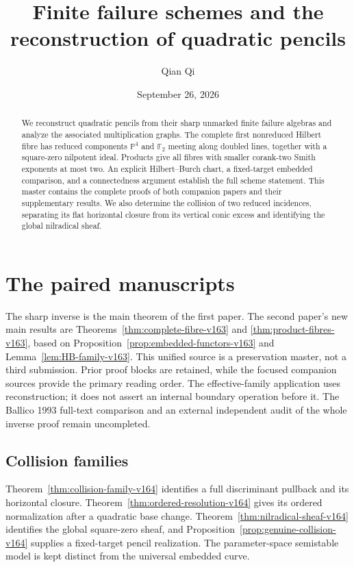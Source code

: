\documentclass[11pt,reqno]{amsart}
\numberwithin{equation}{section}
\theoremstyle{definition}\newtheorem{definition}[theorem]{Definition}
\theoremstyle{remark}\newtheorem{remark}[theorem]{Remark}
\newcommand{\Pj}{\mathbb P}\newcommand{\A}{\mathbb A}
\begin{document}
\title[Finite failure schemes and quadratic pencils]{Finite failure schemes and the reconstruction of quadratic pencils}
\author{Qian Qi}
\date{September 26, 2026}
\begin{abstract}
We reconstruct quadratic pencils from their sharp unmarked finite
failure algebras and analyze the associated multiplication graphs.
The complete first nonreduced Hilbert fibre has reduced components
$\Pj^4$ and $\mathbb F_2$ meeting along doubled lines, together with
a square-zero nilpotent ideal. Products give all fibres with smaller
corank-two Smith exponents at most two. An explicit Hilbert--Burch
chart, a fixed-target embedded comparison, and a connectedness
argument establish the full scheme statement. This master contains
the complete proofs of both companion papers and their supplementary
results. We also determine the collision of
two reduced incidences, separating its flat horizontal closure from
its vertical conic excess and identifying the global nilradical sheaf.
\end{abstract}
\maketitle
\section*{The paired manuscripts}
\label{sec:introduction-v153}
The sharp inverse is the main theorem of the first paper. The second
paper's new main results are
Theorems~\ref{thm:complete-fibre-v163} and
\ref{thm:product-fibres-v163}, based on
Proposition~\ref{prop:embedded-functors-v163} and
Lemma~\ref{lem:HB-family-v163}. This unified source is a preservation
master, not a third submission. Prior proof blocks are retained,
while the focused companion sources provide the primary reading order.
The effective-family application uses reconstruction; it does not
assert an internal boundary operation before it. The Ballico 1993
full-text comparison and an external independent audit of the whole
inverse proof remain uncompleted.

\subsection{Collision families}
Theorem~\ref{thm:collision-family-v164} identifies a full discriminant
pullback and its horizontal closure. Theorem~\ref{thm:ordered-resolution-v164}
gives its ordered normalization after a quadratic base change.
Theorem~\ref{thm:nilradical-sheaf-v164} identifies the global square-zero
sheaf, and Proposition~\ref{prop:genuine-collision-v164} supplies a
fixed-target pencil realization. The parameter-space semistable
model is kept distinct from the universal embedded curve.

\end{document}
